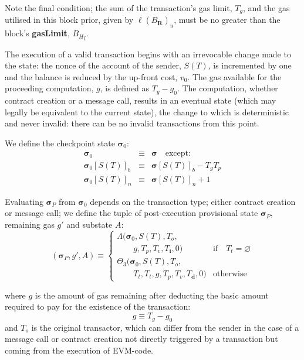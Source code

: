 \documentclass[9pt,oneside]{amsart}
\begin{document}
\begin{multicols}{2}
Note the final condition; the sum of the transaction's gas limit, $T_g$, and the gas utilised in this block prior, given by $\ell(B_\mathbf{R})_u$, must be no greater than the block's \textbf{gasLimit}, ${B_H}_l$. 

The execution of a valid transaction begins with an irrevocable change made to the state: the nonce of the account of the sender, $S(T)$, is incremented by one and the balance is reduced by the up-front cost, $v_0$. The gas available for the proceeding computation, $g$, is defined as $T_g - g_0$. The computation, whether contract creation or a message call, results in an eventual state (which may legally be equivalent to the current state), the change to which is deterministic and never invalid: there can be no invalid transactions from this point.

We define the checkpoint state $\boldsymbol{\sigma}_0$:
\begin{eqnarray}
\boldsymbol{\sigma}_0 & \equiv & \boldsymbol{\sigma} \quad \text{except:} \\
\boldsymbol{\sigma}_0[S(T)]_b & \equiv & \boldsymbol{\sigma}[S(T)]_b - T_g T_p \\
\boldsymbol{\sigma}_0[S(T)]_n & \equiv & \boldsymbol{\sigma}[S(T)]_n + 1
\end{eqnarray}

Evaluating $\boldsymbol{\sigma}_P$ from $\boldsymbol{\sigma}_0$ depends on the transaction type; either contract creation or message call; we define the tuple of post-execution provisional state $\boldsymbol{\sigma}_P$, remaining gas $g'$ and substate $A$:
\begin{equation}
(\boldsymbol{\sigma}_P, g', A) \equiv \begin{cases}
\Lambda(\boldsymbol{\sigma}_0, S(T), T_o, &\\ \quad\quad g, T_p, T_v, T_\mathbf{i}, 0) & \text{if} \quad T_t = \varnothing \\
\Theta_{3}(\boldsymbol{\sigma}_0, S(T), T_o, &\\ \quad\quad T_t, T_t, g, T_p, T_v, T_\mathbf{d}, 0) & \text{otherwise}
\end{cases}
\end{equation}

where $g$ is the amount of gas remaining after deducting the basic amount required to pay for the existence of the transaction:
\begin{equation}
g \equiv T_g - g_0
\end{equation}
and $T_o$ is the original transactor, which can differ from the sender in the case of a message call or contract creation not directly triggered by a transaction but coming from the execution of EVM-code.


\end{multicols}
\end{document}
